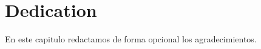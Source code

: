 %
%

\chapter*{Dedication}

\noindent
En este capitulo redactamos de forma opcional los agradecimientos.\\

\blindtext

\cleardoublepage %